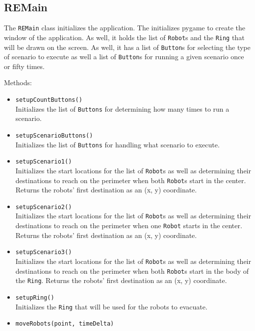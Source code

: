 \documentclass[12pt,letterpaper]{article}
\begin{document}
    \subsection{REMain}
        The \texttt{REMain} class initializes the application. The initializes pygame to create the window of the application. As well, it holds the list of \texttt{Robot}s and the \texttt{Ring} that will be drawn on the screen. As well, it has a list of \texttt{Button}s for selecting the type of scenario to execute as well a list of \texttt{Button}s for running a given scenario once or fifty times.

        \noindent Methods:
        \begin{itemize}
            \item \texttt{setupCountButtons()} \\
                Initializes the list of \texttt{Buttons} for determining how many times to run a scenario.
            \item \texttt{setupScenarioButtons()} \\
                Initializes the list of \texttt{Buttons} for handling what scenario to execute.
            \item \texttt{setupScenario1()} \\
                Initializes the start locations for the list of \texttt{Robot}s as well as determining their destinations to reach on the perimeter when both \texttt{Robot}s start in the center. Returns the robots' first destination as an (x, y) coordinate.
            \item \texttt{setupScenario2()} \\
                Initializes the start locations for the list of \texttt{Robot}s as well as determining their destinations to reach on the perimeter when one \texttt{Robot} starts in the center. Returns the robots' first destination as an (x, y) coordinate.
            \item \texttt{setupScenario3()} \\
                Initializes the start locations for the list of \texttt{Robot}s as well as determining their destinations to reach on the perimeter when both \texttt{Robot}s start in the body of the \texttt{Ring}. Returns the robots' first destination as an (x, y) coordinate.
            \item \texttt{setupRing()} \\
                Initializes the \texttt{Ring} that will be used for the robots to evacuate.
            \item \texttt{moveRobots(point, timeDelta)} \\

\end{itemize}
\end{document}
